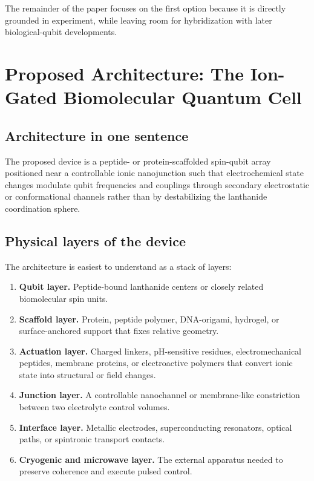 \documentclass[11pt]{report}
\theoremstyle{definition}
\begin{document}
The remainder of the paper focuses on the first option because it is directly grounded in experiment, while leaving room for hybridization with later biological-qubit developments.

\chapter{Proposed Architecture: The Ion-Gated Biomolecular Quantum Cell}

\section{Architecture in one sentence}
The proposed device is a peptide- or protein-scaffolded spin-qubit array positioned near a controllable ionic nanojunction such that electrochemical state changes modulate qubit frequencies and couplings through secondary electrostatic or conformational channels rather than by destabilizing the lanthanide coordination sphere.

\section{Physical layers of the device}
The architecture is easiest to understand as a stack of layers:

\begin{enumerate}[leftmargin=2em]
\item \textbf{Qubit layer.} Peptide-bound lanthanide centers or closely related biomolecular spin units.
\item \textbf{Scaffold layer.} Protein, peptide polymer, DNA-origami, hydrogel, or surface-anchored support that fixes relative geometry.
\item \textbf{Actuation layer.} Charged linkers, pH-sensitive residues, electromechanical peptides, membrane proteins, or electroactive polymers that convert ionic state into structural or field changes.
\item \textbf{Junction layer.} A controllable nanochannel or membrane-like constriction between two electrolyte control volumes.
\item \textbf{Interface layer.} Metallic electrodes, superconducting resonators, optical paths, or spintronic transport contacts.
\item \textbf{Cryogenic and microwave layer.} The external apparatus needed to preserve coherence and execute pulsed control.
\end{enumerate}
\end{document}
